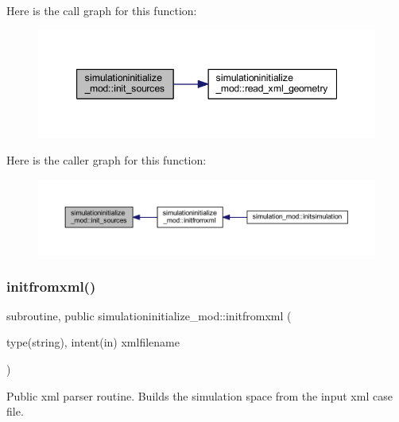 Here is the call graph for this function\+:\nopagebreak
\begin{figure}[H]
\begin{center}
\leavevmode
\includegraphics[width=347pt]{namespacesimulationinitialize__mod_acaa6b217159e3a10e7db04dd7b0e4058_cgraph}
\end{center}
\end{figure}
Here is the caller graph for this function\+:\nopagebreak
\begin{figure}[H]
\begin{center}
\leavevmode
\includegraphics[width=350pt]{namespacesimulationinitialize__mod_acaa6b217159e3a10e7db04dd7b0e4058_icgraph}
\end{center}
\end{figure}
\mbox{\label{namespacesimulationinitialize__mod_ada0310fe0d45fa2eec30deaf3ad25ba7}} 
\subsubsection{\texorpdfstring{initfromxml()}{initfromxml()}}
{\footnotesize\ttfamily subroutine, public simulationinitialize\+\_\+mod\+::initfromxml (\begin{DoxyParamCaption}\item[{type(string), intent(in)}]{xmlfilename }\end{DoxyParamCaption})}



Public xml parser routine. Builds the simulation space from the input xml case file. 

